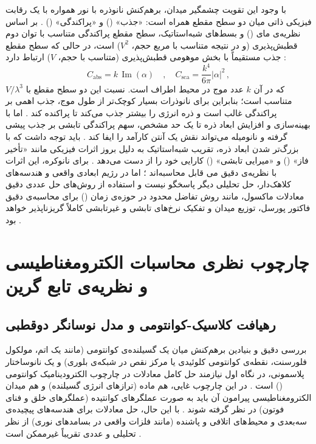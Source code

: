 \documentclass[12pt,a4paper]{report}
\newcommand{\sub}[1]{\mathrm{#1}}               %
\newcommand{\Imag}{\operatorname{Im}}
\begin{document}
با وجود این تقویت چشمگیر میدان، برهم‌کنش نانوذره با نور همواره با یک رقابت فیزیکی ذاتی میان دو سطح مقطع همراه است: «جذب» () و «پراکندگی» () \cite{maier,novotny}. بر اساس نظریه‌ی مای () \cite{mie,bohren} و بسط‌های شبه‌استاتیک، سطح مقطع پراکندگی متناسب با توان دوم قطبش‌پذیری (و در نتیجه متناسب با مربع حجم، $V^2$) است، در حالی که سطح مقطع جذب مستقیماً با بخش موهومی قطبش‌پذیری (متناسب با حجم، $V$) ارتباط دارد \cite{maier,novotny}:
\begin{equation}
C_{\sub{abs}}=k\,\Imag(\alpha)\quad,\quad C_{\sub{sca}}=\frac{k^4}{6\pi}|\alpha|^2\,,
\end{equation}
که در آن $k$ عدد موج در محیط اطراف است. نسبت این دو سطح مقطع با $V/\lambda^3$ متناسب است؛ بنابراین برای نانوذرات بسیار کوچک‌تر از طول موج، جذب اهمی بر پراکندگی غالب است و ذره انرژی را بیشتر جذب می‌کند تا پراکنده کند \cite{maier,novotny}. اما با بهینه‌سازی و افزایش ابعاد ذره تا یک حد مشخص، سهم پراکندگی تابشی بر جذب پیشی گرفته و نانومیله می‌تواند نقش یک آنتن کارآمد را ایفا کند \cite{novotny,maier}. باید توجه داشت که با بزرگ‌تر شدن ابعاد ذره، تقریب شبه‌استاتیک به دلیل بروز اثرات فیزیکی مانند «تأخیر فاز» () و «میرایی تابشی» () کارایی خود را از دست می‌دهد \cite{maier,novotny}. برای نانوکره، این اثرات با نظریه‌ی دقیق می قابل محاسبه‌اند \cite{mie,bohren}؛ اما در رژیم ابعادی واقعی و هندسه‌های کلاهک‌دار، حل تحلیلی دیگر پاسخگو نیست و استفاده از روش‌های حل عددی دقیق معادلات ماکسول، مانند روش تفاضل محدود در حوزه‌ی زمان () برای محاسبه‌ی دقیق فاکتور پورسل، توزیع میدان و تفکیک نرخ‌های تابشی و غیرتابشی کاملاً گریزناپذیر خواهد بود \cite{novotny,taflove}.

\chapter{چارچوب نظری محاسبات الکترومغناطیسی و نظریه‌ی تابع گرین}

\section{رهیافت کلاسیک-کوانتومی و مدل نوسانگر دوقطبی}
بررسی دقیق و بنیادین برهم‌کنش میان یک گسیلنده‌ی کوانتومی (مانند یک اتم، مولکول فلورسنت، نقطه‌ی کوانتومی کلوئیدی یا مرکز نقص در شبکه‌ی بلوری) و یک نانوساختار پلاسمونی، در نگاه اول نیازمند حل کامل معادلات در چارچوب الکترودینامیک کوانتومی () است \cite{novotny}. در این چارچوب غایی، هم ماده (ترازهای انرژی گسیلنده) و هم میدان الکترومغناطیسی پیرامون آن باید به صورت عملگرهای کوانتیده (عملگرهای خلق و فنای فوتون) در نظر گرفته شوند \cite{novotny}. با این حال، حل معادلات  برای هندسه‌های پیچیده‌ی سه‌بعدی و محیط‌های اتلافی و پاشنده (مانند فلزات واقعی در بسامدهای نوری) از نظر تحلیلی و عددی تقریباً غیرممکن است \cite{novotny,koenderink}.
\end{document}
